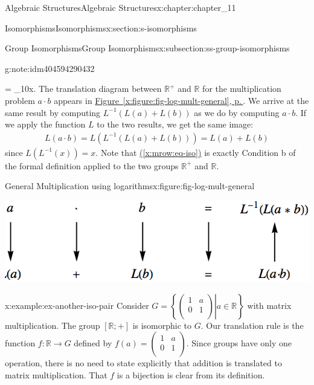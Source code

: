 \documentclass[twoside,10pt,]{book}
\newcommand{\xreffont}{\relax}
\numberwithin{equation}{section}
\begin{document}
\begin{chapterptx}{Algebraic Structures}{}{Algebraic Structures}{}{}{x:chapter:chapter_11}
\begin{sectionptx}{Isomorphisms}{}{Isomorphisms}{}{}{x:section:s-isomorphisms}
\begin{subsectionptx}{Group Isomorphisms}{}{Group Isomorphisms}{}{}{x:subsection:ss-group-isomorphisms}
\begin{note}{}{g:note:idm404594290432}
\begin{enumerate}[label=(\alph*)]
= \log _{10}x\). The translation diagram between \(\mathbb{R}^+\) and \(\mathbb{R}\) for the multiplication problem \(a \cdot  b\) appears in \hyperref[x:figure:fig-log-mult-general]{Figure~{\xreffont\ref{x:figure:fig-log-mult-general}}, p.\,\pageref{x:figure:fig-log-mult-general}}. We arrive at the same result by computing \(L^{-1} (L(a) + L(b))\) as we do by computing \(a \cdot  b\). If we apply the function \(L\) to the two results, we get the same image:%
\begin{gather}
L(a \cdot  b) = L\left(L^{-1}(L(a) + L(b))\right) = L(a) + L(b) \label{x:mrow:eq-iso}
\end{gather}
since \(L\left(L^{-1}(x)\right) = x\). Note that \hyperref[x:mrow:eq-iso]{({\xreffont\ref{x:mrow:eq-iso}})} is exactly Condition b of the formal definition applied to the two groups \(\mathbb{R}^+\) and \(\mathbb{R}\).%
\end{enumerate}
%
\end{note}
\begin{figureptx}{General Multiplication using logarithms}{x:figure:fig-log-mult-general}{}%
\begin{image}{0.15}{0.7}{0.15}%
\includegraphics[width=\linewidth]{images/fig-log-mult-general.png}
\end{image}%
\tcblower
\end{figureptx}%
\begin{example}{}{x:example:ex-another-iso-pair}%
Consider  \(G= \left\{\left.\left(
\begin{array}{cc}
1 & a \\
0 & 1 \\
\end{array}
\right) \right| a \in \mathbb{R}\right\}\) with matrix multiplication.   The group \([\mathbb{R};+]\) is isomorphic to \(G\).   Our translation rule is the function \(f: \mathbb{R} \to G\) defined by \(f(a)=\left(
\begin{array}{cc}
1 & a \\
0 & 1 \\
\end{array}
\right)\).  Since groups have only one operation, there is no need to state explicitly that addition is translated to matrix multiplication. That \(f\) is a bijection is clear from its definition.%

\end{example}
\end{subsectionptx}
\end{sectionptx}
\end{chapterptx}
\end{document}
